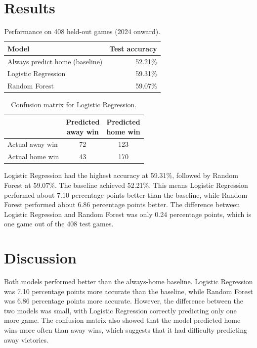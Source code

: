 \documentclass[sigconf,nonacm]{acmart}
\begin{document}
\section{Results}
\begin{table}[t]
\centering
\footnotesize
\begin{tabular}{@{}lr@{}}
\toprule
Model & Test   accuracy \\
\midrule
Always   predict home (baseline) & 52.21\% \\
Logistic   Regression & 59.31\% \\
Random Forest & 59.07\% \\
\bottomrule
\end{tabular}
\caption{Performance on 408 held-out games (2024 onward).}
\end{table}
\begin{table}[t]
\centering
\scriptsize
\begin{tabular}{@{}lcc@{}}
\toprule
 & \shortstack{Predicted\\away win} & \shortstack{Predicted\\home win} \\
\midrule
Actual away win & 72 & 123 \\
Actual home win & 43 & 170 \\
\bottomrule
\end{tabular}
\caption{Confusion matrix for Logistic Regression.}
\end{table}
Logistic Regression had the highest accuracy at 59.31\%, followed by Random Forest at 59.07\%. The baseline achieved 52.21\%. This means Logistic Regression performed about 7.10 percentage points better than the baseline, while Random Forest performed about 6.86 percentage points better. The difference between Logistic Regression and Random Forest was only 0.24 percentage points, which is one game out of the 408 test games.

\section{Discussion}
Both models performed better than the always-home baseline. Logistic Regression was 7.10 percentage points more accurate than the baseline, while Random Forest was 6.86 percentage points more accurate. However, the difference between the two models was small, with Logistic Regression correctly predicting only one more game. The confusion matrix also showed that the model predicted home wins more often than away wins, which suggests that it had difficulty predicting away victories.
\end{document}
